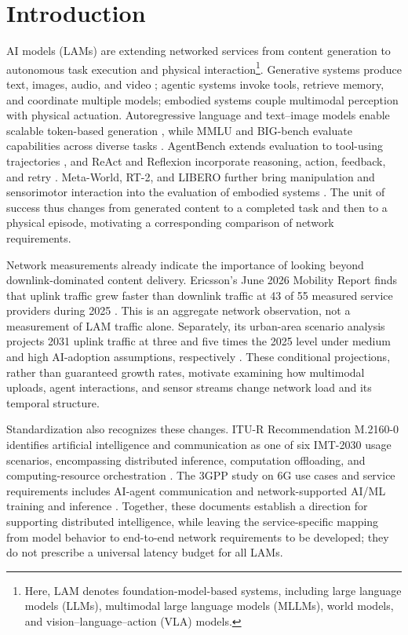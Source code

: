\documentclass[letterpaper,journal]{IEEEtran}
\begin{document}
\section{Introduction}
\label{sec:introduction}
 AI models (LAMs) are extending networked services from
content generation to autonomous task execution and physical interaction\footnote{Here, LAM denotes foundation-model-based systems,
including large language models (LLMs), multimodal large language models
(MLLMs), world models, and vision--language--action (VLA) models. }.
Generative systems produce text, images, audio, and video
\cite{nvidiagenai}; agentic systems invoke tools, retrieve memory, and
coordinate multiple models; embodied systems couple multimodal perception
with physical actuation. 
Autoregressive language and text--image models enable
scalable token-based generation \cite{gpt3,dalle}, while MMLU and BIG-bench
evaluate capabilities across diverse tasks \cite{mmlu,bigbench}. AgentBench
extends evaluation to tool-using trajectories \cite{agentbench}, and ReAct
and Reflexion incorporate reasoning, action, feedback, and retry
\cite{react,reflexion}. Meta-World, RT-2, and LIBERO further bring
manipulation and sensorimotor interaction into the evaluation of embodied
systems \cite{metaworld,rt2,libero}. The unit of success thus changes from
generated content to a completed task and then to a physical episode,
motivating a corresponding comparison of network requirements.

Network measurements already indicate the importance of looking beyond
downlink-dominated content delivery. Ericsson's June 2026 Mobility Report
finds that uplink traffic grew faster than downlink traffic at 43 of 55
measured service providers during 2025 \cite{ericssonuplink2026}. This is
an aggregate network observation, not a measurement of LAM traffic alone.
Separately, its urban-area scenario analysis projects 2031 uplink traffic
at three and five times the 2025 level under medium and high AI-adoption
assumptions, respectively \cite{ericssonuplink2026}. These conditional
projections, rather than guaranteed growth rates, motivate examining how
multimodal uploads, agent interactions, and sensor streams change network
load and its temporal structure.

Standardization also recognizes these changes. ITU-R Recommendation
M.2160-0 identifies artificial intelligence and communication as one of
six IMT-2030 usage scenarios, encompassing distributed inference,
computation offloading, and computing-resource orchestration
\cite{itu2160}. The 3GPP study on 6G use cases and service requirements
includes AI-agent communication and network-supported AI/ML training and
inference \cite{3gpp22870}. Together, these documents establish a direction
for supporting distributed intelligence, while leaving the service-specific
mapping from model behavior to end-to-end network requirements to be
developed; they do not prescribe a universal latency budget for all LAMs.
\end{document}
